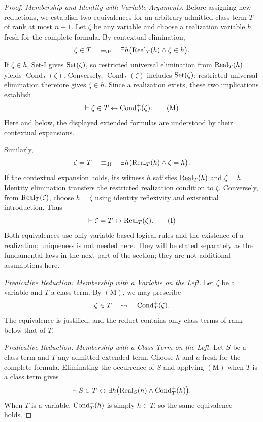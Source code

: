 \begin{proof}
\medskip
\noindent\emph{Membership and Identity with Variable Arguments.}
Before assigning new reductions, we establish two equivalences for
an arbitrary admitted class term \(T\) of rank at most \(n+1\). Let \(\zeta\) be any variable and
choose a realization variable \(h\) fresh for the complete formula.
By contextual elimination,
\[
\zeta\in T
\quad\mathrel{\equiv_{\mathrm{df}}}\quad
\exists h\bigl(\operatorname{Real}_T(h)\land\zeta\in h\bigr).
\]
If \(\zeta\in h\), Set-I gives \(\operatorname{Set}(\zeta)\), so restricted
universal elimination from \(\operatorname{Real}_T(h)\) yields
\(\operatorname{Cond}_T(\zeta)\). Conversely,
\(\operatorname{Cond}_T(\zeta)\) includes \(\operatorname{Set}(\zeta)\);
restricted universal elimination therefore gives
\(\zeta\in h\). Since a realization exists, these two
implications establish
\[
\vdash\zeta\in T\leftrightarrow \operatorname{Cond}_T^{+}(\zeta).
\tag{M}
\]
Here and below, the displayed extended formulas are understood by
their contextual expansions.

Similarly,
\[
\zeta=T
\quad\mathrel{\equiv_{\mathrm{df}}}\quad
\exists h\bigl(\operatorname{Real}_T(h)\land\zeta=h\bigr).
\]
If the contextual expansion holds, its witness \(h\) satisfies
\(\operatorname{Real}_T(h)\) and \(\zeta=h\). Identity elimination transfers
the restricted realization condition to \(\zeta\). Conversely,
from \(\operatorname{Real}_T(\zeta)\), choose \(h=\zeta\) using identity
reflexivity and existential introduction. Thus
\[
\vdash\zeta=T\leftrightarrow\operatorname{Real}_T(\zeta).
\tag{I}
\]
Both equivalences use only variable-based logical rules and the
existence of a realization; uniqueness is not needed here.
They will be stated separately as the fundamental laws in the next
part of the section; they are not additional assumptions here.

\medskip
\noindent\emph{Predicative Reduction: Membership with a Variable
on the Left.}
Let \(\zeta\) be a variable and \(T\) a class term. By
\((\mathrm{M})\), we may prescribe
\[
\zeta\in T\quad\rightsquigarrow\quad \operatorname{Cond}_T^{+}(\zeta).
\]
The equivalence is justified, and the reduct contains only class
terms of rank below that of \(T\).

\medskip
\noindent\emph{Predicative Reduction: Membership with a Class
Term on the Left.}
Let \(S\) be a class term and \(T\) any admitted extended term.
Choose \(h\) and \(a\) fresh for the complete formula. Eliminating
the occurrence of \(S\) and applying \((\mathrm{M})\) when \(T\)
is a class term gives
\[
\vdash
S\in T
\leftrightarrow
\exists h\bigl(\operatorname{Real}_S(h)\land \operatorname{Cond}_T^{+}(h)\bigr).
\]
When \(T\) is a variable, \(\operatorname{Cond}_T^{+}(h)\) is simply \(h\in T\), so the
same equivalence holds.


\end{proof}
